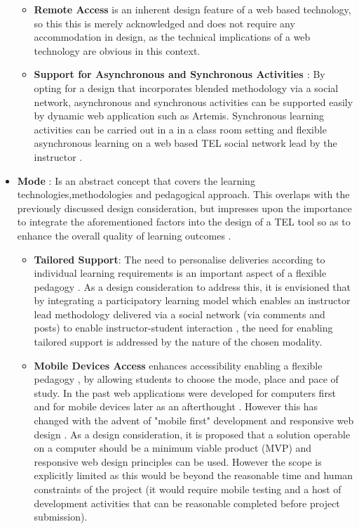 \begin{itemize}[\null]
\begin{itemize}

\item \textbf{Remote Access} is an inherent design feature of a web based technology, so this this is merely acknowledged and does not require any accommodation in design, as the technical implications of a web technology are obvious in this context.




\item \textbf{Support for Asynchronous and Synchronous Activities \cite{Gordon2014}}: By opting for a design that incorporates blended methodology via a social network, asynchronous and synchronous activities can be supported easily by dynamic web application such as Artemis. Synchronous learning activities can be carried out in a in a class room setting and flexible asynchronous learning on a web based TEL social network lead by the instructor \cite{Gordon2014}.

\end{itemize}

\item \textbf{Mode} : Is an abstract concept that covers the learning technologies,methodologies and pedagogical approach. This overlaps with the previously discussed design consideration, but impresses upon the importance to integrate the aforementioned factors into the design of a TEL tool \cite{Gordon2014} so as to enhance the overall quality of learning outcomes \cite{Cubukcuo2012}.

\begin{itemize}
\item \textbf{Tailored Support}: The need to personalise deliveries according to individual learning requirements is an important aspect of a flexible pedagogy \cite{Gordon2014}. As a design consideration to address this, it is envisioned that  by integrating a participatory learning model \cite{Yager1990,Yager2004} which enables an instructor lead methodology \cite{RickReis,Team2008} delivered via a social network (via comments and posts) to enable instructor-student interaction \cite{Cubukcuo2012}, the need for enabling tailored support is addressed by the nature of the chosen modality.



\item \textbf{Mobile Devices Access}  enhances accessibility enabling a flexible pedagogy \cite{Gordon2014}, by allowing students to choose the mode, place and pace of study. In the past web applications were  developed for computers first and for mobile devices later as an afterthought \cite{W3.CSS2016}. However this has changed with the advent of "mobile first" development and responsive web design \cite{W3.CSS2016}. As a design consideration, it is proposed that a solution operable on a computer should be a minimum viable product (MVP) and responsive web design principles \cite{W3.CSS2016} can be used. However the scope is explicitly limited as this would be beyond the reasonable time and human constraints of the project (it would require mobile testing and a host of development activities that can be reasonable completed before project submission).


\end{itemize}
\end{itemize}
